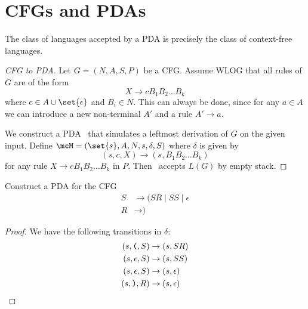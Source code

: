 \section{CFGs and PDAs} \label{sec:cfg:pda_equivalence}
\begin{theorem}[Chomsky] \label{thm:cfg:chomsky}
    The class of languages accepted by a PDA is precisely the class of
    context-free languages.
\end{theorem}
\begin{proof}[CFG to PDA]
    Let $G = (N, A, S, P)$ be a CFG.
    Assume WLOG that all rules of $G$ are of the form \[
        X \to c B_1 B_2 \dots B_k
    \] where $c \in A \cup \set{\epsilon}$ and $B_i \in N$.
    This can always be done, since for any $a \in A$ we can introduce a new
    non-terminal $A'$ and a rule $A' \to a$.

    We construct a PDA \mcM\ that simulates a leftmost derivation of $G$ on
    the given input.
    Define $\mcM = (\set{s}, A, N, s, \delta, S)$ where $\delta$ is given
    by \[
        (s, c, X) \to (s, B_1 B_2 \dots B_k)
    \] for any rule $X \to c B_1 B_2 \dots B_k$ in $P$.
    Then \mcM\ accepts $L(G)$ by empty stack.
\end{proof}

\begin{exercise}
    Construct a PDA for the CFG \begin{align*}
        S &\to \texttt{(}SR \mid SS \mid \epsilon \\
        R &\to \texttt{)}
    \end{align*}
\end{exercise}
\begin{proof}
    We have the following transitions in $\delta$:
    \begin{align*}
        (s, \texttt{(}, S) &\to (s, SR) \\
        (s, \epsilon, S) &\to (s, SS) \\
        (s, \epsilon, S) &\to (s, \epsilon) \\
        (s, \texttt{)}, R) &\to (s, \epsilon) \qedhere
    \end{align*}
\end{proof}

